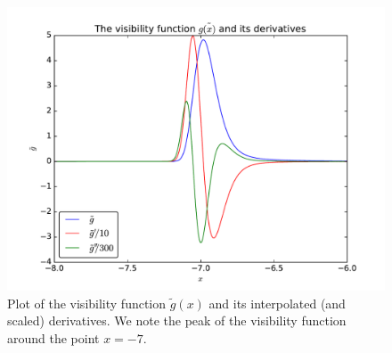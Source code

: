 \documentclass[12pt]{article}
\begin{document}
\begin{figure}[H]
\centering
\includegraphics[width=\linewidth]{Plots/VisibilityFunc.pdf}
\caption{Plot of the visibility function $\tilde{g}(x)$ and its interpolated (and scaled) derivatives. We note the peak of the visibility function around the point $x=-7$. }
\end{figure}

\newpage
\FloatBarrier
\end{document}
